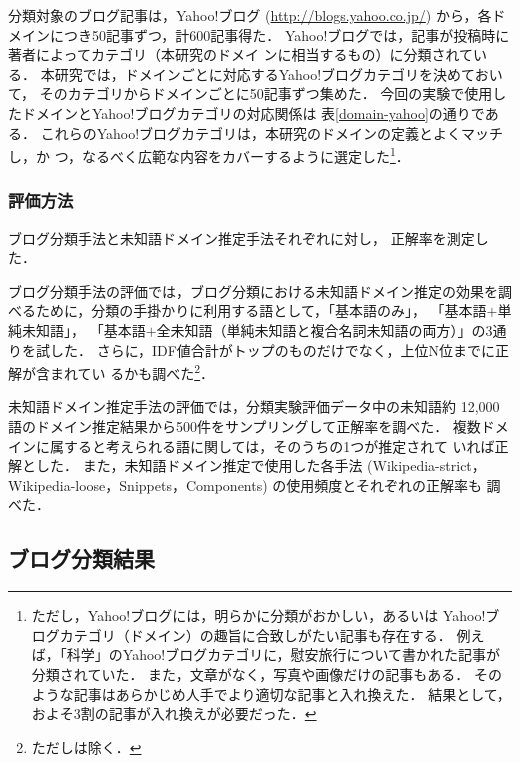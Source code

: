 \documentclass[japanese]{jnlp_1.4}
\newcommand{\revise}[1]{}
\newcommand{\dom}[1]{}
\begin{document}
分類対象のブログ記事は，Yahoo!ブログ (\url{http://blogs.yahoo.co.jp/})
から，各ドメインにつき50記事ずつ，計600記事得た．
Yahoo!ブログでは，記事が投稿時に著者によってカテゴリ（本研究のドメイ
ンに相当するもの）に分類されている．
本研究では，ドメインごとに対応するYahoo!ブログカテゴリを決めておいて，
そのカテゴリからドメインごとに50記事ずつ集めた．
今回の実験で使用したドメインとYahoo!ブログカテゴリの対応関係は
表\ref{domain-yahoo}の通りである．
これらのYahoo!ブログカテゴリは，本研究のドメインの定義とよくマッチし，か
つ，なるべく広範な内容をカバーするように選定した\footnote{
ただし，Yahoo!ブログには，明らかに分類がおかしい，あるいは
Yahoo!ブログカテゴリ（ドメイン）の趣旨に合致しがたい記事も存在する．
例えば，「科学」のYahoo!ブログカテゴリに，慰安旅行について書かれた記事が
分類されていた．
また，文章がなく，写真や画像だけの記事もある．
そのような記事はあらかじめ人手でより適切な記事と入れ換えた．
結果として，およそ3割の記事が入れ換えが必要だった．
}．



\subsubsection{評価方法}

ブログ分類手法と未知語ドメイン推定手法それぞれに対し，
正解率を測定した．

ブログ分類手法の評価では，ブログ分類における未知語ドメイン推定の効果を調
べるために，分類の手掛かりに利用する語として，「基本語のみ」，
「基本語$+$単純未知語」，
「基本語$+$全未知語（単純未知語と複合名詞未知語の両方）」の3通りを試した．
さらに，IDF値合計がトップのものだけでなく，上位N位までに正解が含まれてい
るかも調べた\footnote{ただし\dom{ドメイン無し}は除く．}．

\revise{
加えて，人手修正無しの基本語ドメイン辞書を用いた場合と，
スコアにIDF値ではなくドメインごとの語数を用いた場合の
ブログ分類結果も調査した．
これらに関しては「基本語$+$全未知語」のみを試した．
}

未知語ドメイン推定手法の評価では，分類実験評価データ中の未知語約
12,000語のドメイン推定結果から500件をサンプリングして正解率を調べた．
複数ドメインに属すると考えられる語に関しては，そのうちの1つが推定されて
いれば正解とした．
また，未知語ドメイン推定で使用した各手法 (Wikipedia-strict，
Wikipedia-loose，Snippets，Components) の使用頻度とそれぞれの正解率も
調べた．


\subsection{ブログ分類結果}
\end{document}
